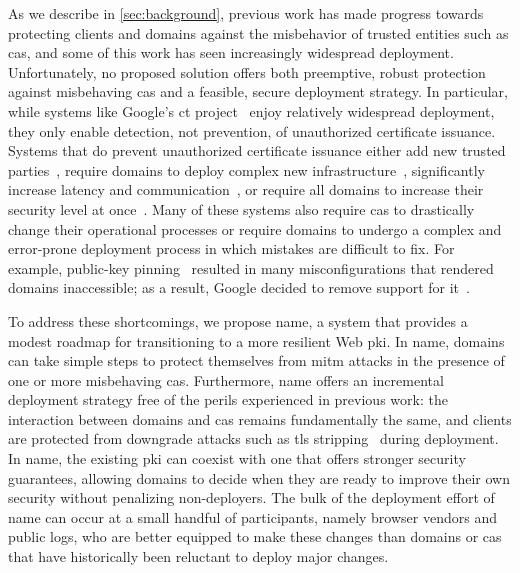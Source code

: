 As we describe in \autoref{sec:background}, previous work has made progress
towards protecting clients and domains against the misbehavior of trusted
entities such as \acp{ca}, and some of this work has seen increasingly
widespread deployment. Unfortunately, no proposed solution offers both
preemptive, robust protection against misbehaving \acp{ca} and a feasible,
secure deployment strategy. In particular, while systems like Google's \ac{ct}
project~\cite{rfc6962,ct-laurie} enjoy relatively widespread deployment, they only enable
detection, not prevention, of unauthorized certificate issuance. Systems that do
prevent unauthorized certificate issuance either add new trusted
parties~\cite{kim2013accountable}, require domains to deploy complex new
infrastructure~\cite{rfc6698, szalachowski2014policert}, significantly increase
latency and communication~\cite{yu2016dtki}, or require all domains to increase
their security level at once~\cite{basin2014arpki}. Many of these systems also
require \acp{ca} to drastically change their operational processes or require
domains to undergo a complex and error-prone deployment process in which
mistakes are difficult to fix. For example, public-key pinning~\cite{rfc7469,mid-air}
resulted in many misconfigurations that rendered domains inaccessible; as a result,
Google decided to remove support for it~\cite{palmer2017intent}.

To address these shortcomings, we propose \ac{name}, a system that provides a
modest roadmap for transitioning to a more resilient Web \ac{pki}. In \ac{name},
domains can take simple steps to protect themselves from \ac{mitm} attacks in
the presence of one or more misbehaving \acp{ca}. Furthermore, \ac{name} offers
an incremental  deployment strategy free of the perils experienced in previous
work: the interaction between domains and \acp{ca} remains fundamentally the
same, and clients are protected from downgrade attacks such as \ac{tls}
stripping~\cite{marlinspike2009new} during deployment. In \ac{name}, the
existing \ac{pki} can coexist with one that offers stronger security guarantees,
allowing domains to decide when they are ready to improve their own security
without penalizing non-deployers. The bulk of the deployment effort of \ac{name}
can occur at a small handful of participants, namely browser vendors and public
logs, who are better equipped to make these changes than domains or \acp{ca}
that have historically been reluctant to deploy major changes.

